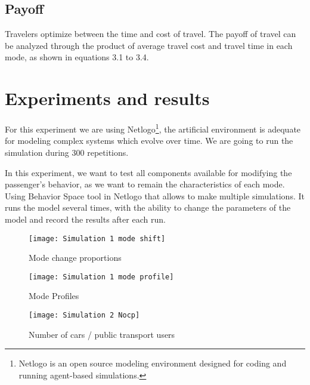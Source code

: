 \subsection{Payoff}
Travelers optimize between the time and cost of travel. The payoff of travel can be analyzed through the product of average travel cost and travel time in each mode, as shown in equations 3.1 to 3.4.

\section{Experiments and results}
For this experiment we are using Netlogo\footnote{Netlogo is an open source modeling environment designed for coding and running agent-based simulations.}, the artificial environment is adequate for modeling complex systems which evolve over time. We are going to run the simulation during 300 repetitions.

In this experiment, we want to test all components available for modifying the passenger's behavior, as we want to remain the characteristics of each mode.
Using Behavior Space tool in Netlogo that allows to make multiple simulations. It runs the model several times, with the ability to change the parameters of the model and record the results after each run.

\begin{figure}[h!]\label{fig:31}
\begin{center}
\texttt{[image: Simulation 1 mode shift]}
\end{center}
\caption{Mode change proportions}
\end{figure}

\begin{figure}[h!]\label{f:32}
\begin{center}
\texttt{[image: Simulation 1 mode profile]}
\end{center}
\caption{Mode Profiles}
\end{figure}

\begin{figure}[h!]\label{f:33}
\begin{center}
\texttt{[image: Simulation 2 Nocp]}
\end{center}
\caption{Number of cars / public transport users}
\end{figure}

